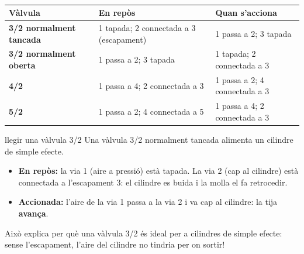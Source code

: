 \begin{center}
\\[2.2em]
\end{center}

\begin{center}
\renewcommand{\arraystretch}{1.5}
\begin{tabular}{@{}lll@{}}
\toprule
\textbf{Vàlvula} & \textbf{En repòs} & \textbf{Quan s'acciona}\\
\midrule
\textbf{3/2 normalment tancada} & 1 tapada; 2 connectada a 3 (escapament) & 1 passa a 2; 3 tapada\\
\textbf{3/2 normalment oberta} & 1 passa a 2; 3 tapada & 1 tapada; 2 connectada a 3\\
\textbf{4/2} & 1 passa a 4; 2 connectada a 3 & 1 passa a 2; 4 connectada a 3\\
\textbf{5/2} & 1 passa a 2; 4 connectada a 5 & 1 passa a 4; 2 connectada a 3\\
\bottomrule
\end{tabular}
\end{center}

\begin{exemple}{llegir una vàlvula 3/2}
Una vàlvula 3/2 normalment tancada alimenta un cilindre de simple efecte.
\begin{itemize}
 \item \textbf{En repòs:} la via 1 (aire a pressió) està tapada. La via 2 (cap al cilindre) està connectada a l'escapament 3: el cilindre es buida i la molla el fa retrocedir.
 \item \textbf{Accionada:} l'aire de la via 1 passa a la via 2 i va cap al cilindre: la tija \textbf{avança}.
\end{itemize}
Això explica per què una vàlvula 3/2 és ideal per a cilindres de simple efecte: sense l'escapament, l'aire del cilindre no tindria per on sortir!
\end{exemple}

